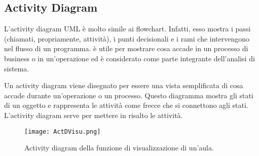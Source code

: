 \subsection{Activity Diagram}
L’activity diagram UML è molto simile ai flowchart. Infatti, esso mostra i passi (chiamati, propriamente, attività), i punti decisionali e i rami che intervengono nel flusso di un programma. è utile per mostrare cosa accade in un processo di business o in un’operazione ed è considerato come parte integrante dell’analisi di sistema.

Un activity diagram viene disegnato per essere una vista semplificata di cosa accade durante un’operazione o un processo. Questo diagramma mostra gli stati di un oggetto e rappresenta le attività come frecce che si connettono agli stati. L’activity diagram serve per mettere in risalto le attività.

\begin{figure}[!htb]
\centering%
\texttt{[image: ActDVisu.png]}%
\caption{Activity diagram della funzione di visualizzazione di un'aula.}\label{fig:umlActDVisu}%
\end{figure}